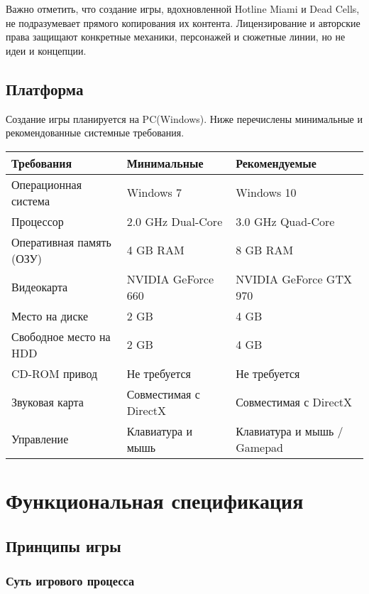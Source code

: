 \documentclass[12pt]{article}
\begin{document}
        \setlength{\parindent}{1.5em}Важно отметить, что создание игры, вдохновленной Hotline Miami и Dead Cells, не подразумевает прямого копирования их контента. Лицензирование и авторские права защищают конкретные механики, персонажей и сюжетные линии, но не идеи и концепции.
    \subsection{Платформа}
    Создание игры планируется на PC(Windows). Ниже перечислены минимальные и рекомендованные системные требования.
    \begin{table}[h]
        \centering
        \begin{tabular}{@{}lll@{}}
            \toprule
            \textbf {Требования} & \textbf {Минимальные} & \textbf {Рекомендуемые} \\ \midrule
            Операционная система & Windows 7 & Windows 10 \\ 
            Процессор & 2.0 GHz Dual-Core & 3.0 GHz Quad-Core \\ 
            Оперативная память (ОЗУ) & 4 GB RAM & 8 GB RAM \\ 
            Видеокарта & NVIDIA GeForce 660& NVIDIA GeForce GTX 970 \\ 
            Место на диске & 2 GB & 4 GB \\ 
            Свободное место на HDD & 2 GB & 4 GB \\ 
            CD-ROM привод & Не требуется & Не требуется \\ 
            Звуковая карта & Совместимая с DirectX & Совместимая с DirectX \\ 
            Управление & Клавиатура и мышь & Клавиатура и мышь / Gamepad \\ 
            \bottomrule
        \end{tabular}
    \end{table}

\section{Функциональная спецификация}
    \subsection{Принципы игры}
        \subsubsection{Суть игрового процесса}
\end{document}

